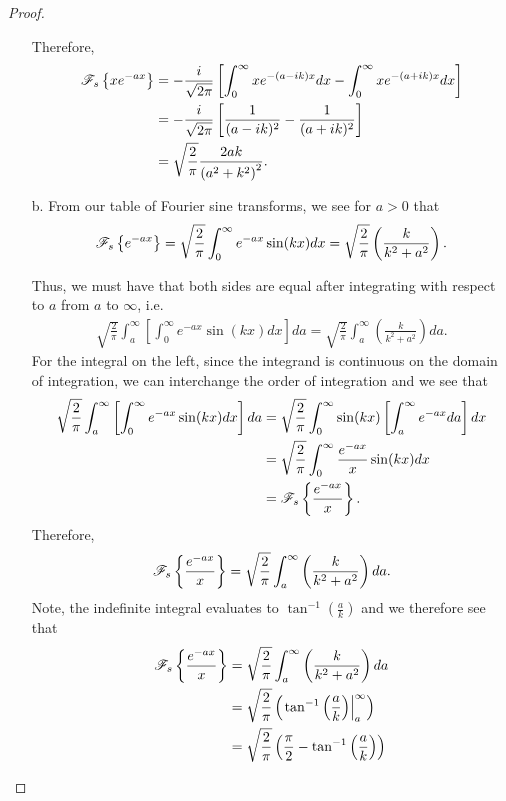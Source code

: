 \begin{proof}
\begin{enumerate}
      Therefore,
      \begin{align*}
        \mathscr{F}_s\left\{ {xe^{-ax}} \right\} &= -\frac{i}{\sqrt{2\pi}}\left[\int_0^\infty x e^{-(a-ik)x}dx - \int_0^\infty x e^{-(a+ik)x}dx\right] \\
        &= -\frac{i}{\sqrt{2\pi}}\left[\frac{1}{(a-ik)^2} - \frac{1}{(a+ik)^2}\right] \\
        &= \sqrt{\frac{2}{\pi}}\frac{2 ak}{\left(a^2 + k^2\right)^2}.
      \end{align*}

    \item[b.] From our table of Fourier sine transforms,
      we see for $a>0$ that
      \begin{align*}
        \mathscr{F}_s\left\{ {e^{-ax}} \right\} = \sqrt{\frac{2}{\pi}}\int_{0}^\infty e^{-ax}\sin(kx) dx = \sqrt{\frac{2}{\pi}}\left(\frac{k}{k^2 + a^2}\right).
      \end{align*}

      Thus, we must have that both sides are equal after integrating with respect to $a$ from $a$ to $\infty$, i.e.
      \begin{align*}
        \sqrt{\frac{2}{\pi}}\int_{a}^\infty \left[\int_{0}^\infty e^{-ax}\sin(kx) dx \right]da = \sqrt{\frac{2}{\pi}}\int_a^\infty\left(\frac{k}{k^2 + a^2}\right)da.
      \end{align*}
      For the integral on the left, since the integrand is continuous on the domain of integration, we can interchange the order of integration
      and we see that
      \begin{align*}
        \sqrt{\frac{2}{\pi}}\int_{a}^\infty \left[\int_{0}^\infty e^{-ax}\sin(kx) dx \right]da
        &= \sqrt{\frac{2}{\pi}} \int_{0}^\infty \sin(kx) \left[\int_{a}^\infty  e^{-ax}da \right]dx \\
        &= \sqrt{\frac{2}{\pi}} \int_{0}^\infty \frac{e^{-ax}}{x}\sin(kx) dx \\
        &= \mathscr{F}_s\left\{ {\frac{e^{-ax}}{x}} \right\}.
      \end{align*}
      Therefore,
      \begin{align*}
        \mathscr{F}_s\left\{ {\frac{e^{-ax}}{x}} \right\} = \sqrt{\frac{2}{\pi}}\int_a^\infty\left(\frac{k}{k^2 + a^2}\right)da.
      \end{align*}
      Note, the indefinite integral evaluates to $\displaystyle \tan^{-1}\left(\frac{a}{k}\right)$ and we
      therefore see that
      \begin{align*}
        \mathscr{F}_s\left\{ {\frac{e^{-ax}}{x}} \right\} &= \sqrt{\frac{2}{\pi}}\int_a^\infty\left(\frac{k}{k^2 + a^2}\right)da \\
        &= \sqrt{\frac{2}{\pi}} \left(\left. \tan^{-1}\left(\frac{a}{k}\right) \right\rvert_{a}^\infty\right) \\
        &= \sqrt{\frac{2}{\pi}}\left(\frac{\pi}{2} - \tan^{-1}\left(\frac{a}{k}\right) \right)
      \end{align*}


  \end{enumerate}
\end{proof}
\newpage
